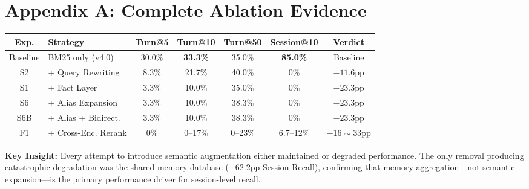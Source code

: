 \documentclass[11pt,a4paper]{article}
\begin{document}
\section*{Appendix A: Complete Ablation Evidence}

\begin{table}[h]
\centering
\small
\begin{tabular}{clccccc}
\toprule
\textbf{Exp.} & \textbf{Strategy} & \textbf{Turn@5} & \textbf{Turn@10} & \textbf{Turn@50} & \textbf{Session@10} & \textbf{Verdict} \\
\midrule
Baseline & BM25 only (v4.0) & 30.0\% & \textbf{33.3\%} & 35.0\% & \textbf{85.0\%} & Baseline \\
S2 & + Query Rewriting & 8.3\% & 21.7\% & 40.0\% & 0\% & $-11.6$pp \\
S1 & + Fact Layer & 3.3\% & 10.0\% & 35.0\% & 0\% & $-23.3$pp \\
S6 & + Alias Expansion & 3.3\% & 10.0\% & 38.3\% & 0\% & $-23.3$pp \\
S6B & + Alias + Bidirect. & 3.3\% & 10.0\% & 38.3\% & 0\% & $-23.3$pp \\
F1 & + Cross-Enc. Rerank & 0\% & 0--17\% & 0--23\% & 6.7--12\% & $-16\sim33$pp \\
\bottomrule
\end{tabular}
\end{table}

\textbf{Key Insight:} Every attempt to introduce semantic augmentation either maintained or degraded performance. The only removal producing catastrophic degradation was the shared memory database ($-62.2$pp Session Recall), confirming that memory aggregation---not semantic expansion---is the primary performance driver for session-level recall.
\end{document}
